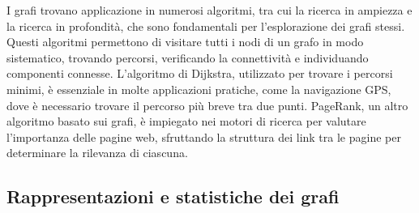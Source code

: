 \documentclass{article}
\begin{document}
I grafi trovano applicazione in numerosi algoritmi, tra cui la ricerca in ampiezza e la ricerca in profondità, che sono fondamentali per l'esplorazione dei grafi stessi. Questi algoritmi permettono di visitare tutti i nodi di un grafo in modo sistematico, trovando percorsi, verificando la connettività e individuando componenti connesse. L'algoritmo di Dijkstra, utilizzato per trovare i percorsi minimi, è essenziale in molte applicazioni pratiche, come la navigazione GPS, dove è necessario trovare il percorso più breve tra due punti. PageRank, un altro algoritmo basato sui grafi, è impiegato nei motori di ricerca per valutare l'importanza delle pagine web, sfruttando la struttura dei link tra le pagine per determinare la rilevanza di ciascuna.

\subsection{Rappresentazioni e statistiche dei grafi}
\end{document}
